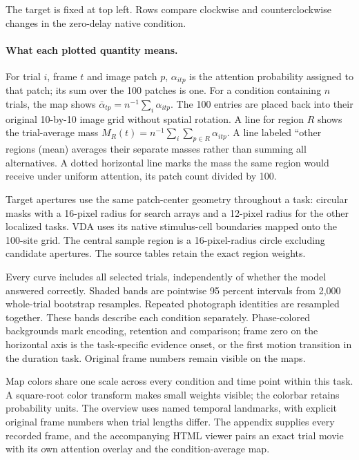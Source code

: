 \documentclass[11pt]{article}
\begin{document}
The target is fixed at top left. Rows compare clockwise and counterclockwise changes in the zero-delay native condition.

\paragraph{What each plotted quantity means.}
For trial $i$, frame $t$ and image patch $p$, $\alpha_{itp}$ is the attention probability assigned to that patch; its sum over the 100 patches is one. For a condition containing $n$ trials, the map shows $\bar\alpha_{tp}=n^{-1}\sum_i\alpha_{itp}$. The 100 entries are placed back into their original 10-by-10 image grid without spatial rotation. A line for region $R$ shows the trial-average mass $M_R(t)=n^{-1}\sum_i\sum_{p\in R}\alpha_{itp}$. A line labeled ``other regions (mean) averages their separate masses rather than summing all alternatives. A dotted horizontal line marks the mass the same region would receive under uniform attention, its patch count divided by 100.

Target apertures use the same patch-center geometry throughout a task: circular masks with a 16-pixel radius for search arrays and a 12-pixel radius for the other localized tasks. VDA uses its native stimulus-cell boundaries mapped onto the 100-site grid. The central sample region is a 16-pixel-radius circle excluding candidate apertures. The source tables retain the exact region weights.

Every curve includes all selected trials, independently of whether the model answered correctly. Shaded bands are pointwise 95 percent intervals from 2,000 whole-trial bootstrap resamples. Repeated photograph identities are resampled together. These bands describe each condition separately. Phase-colored backgrounds mark encoding, retention and comparison; frame zero on the horizontal axis is the task-specific evidence onset, or the first motion transition in the duration task. Original frame numbers remain visible on the maps.

Map colors share one scale across every condition and time point within this task. A square-root color transform makes small weights visible; the colorbar retains probability units. The overview uses named temporal landmarks, with explicit original frame numbers when trial lengths differ. The appendix supplies every recorded frame, and the accompanying HTML viewer pairs an exact trial movie with its own attention overlay and the condition-average map.
\end{document}
